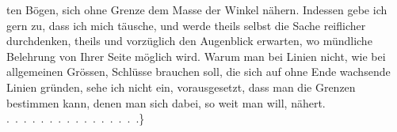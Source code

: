 %
ten Bögen, sich ohne Grenze dem Masse der Winkel nähern. Indessen gebe ich gern zu, dass ich mich täusche, und werde theils selbst die Sache reiflicher durchdenken, theils und vorzüglich den Augenblick erwarten, wo mündliche Belehrung von Ihrer Seite möglich wird. Warum man bei Linien nicht, wie bei allgemeinen Grössen, Schlüsse brauchen soll, die sich auf ohne Ende wachsende Linien gründen, sehe ich nicht ein, vorausgesetzt, dass man die Grenzen bestimmen kann, denen man sich dabei, so weit man will, nähert. \mbox{.\ .\ .\ .\ .\ .\ .\ .\ .\ .\ .\ .\ .\ .\ .\ .}\}
